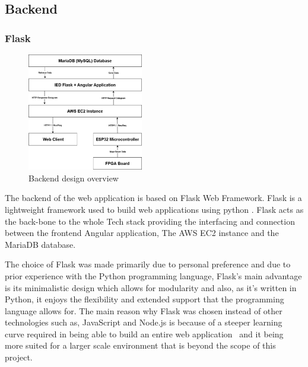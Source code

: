 \subsection{Backend}

\subsubsection{Flask}
\begin{figure}
    \centerline{\includegraphics[width=0.45\textwidth]{images/backend-flow.png}}
    \caption{Backend design overview}
\end{figure}

The backend of the web application is based on Flask Web Framework. Flask is a lightweight framework used to build web applications using python \cite{ref:whatisflask}. Flask acts as the back-bone to the whole Tech stack providing the interfacing and connection between the frontend Angular application, The AWS EC2 instance and the MariaDB database.  

The choice of Flask was made primarily due to personal preference and due to prior experience with the Python programming language, Flask’s main advantage is its minimalistic design which allows for modularity and also, as it's written in Python, it enjoys the flexibility and extended support that the programming language allows for. The main reason why Flask was chosen instead of other technologies such as, JavaScript and Node.js is because of a steeper learning curve required in being able to build an entire web application~\cite{ref:nodevsflask} and it being more suited for a larger scale environment that is beyond the scope of this project.


